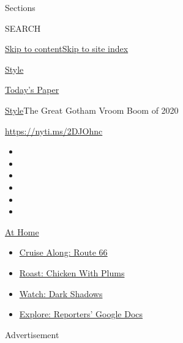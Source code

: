 Sections

SEARCH

\protect\hyperlink{site-content}{Skip to
content}\protect\hyperlink{site-index}{Skip to site index}

\href{https://www.nytimes3xbfgragh.onion/section/style}{Style}

\href{https://myaccount.nytimes3xbfgragh.onion/auth/login?response_type=cookie\&client_id=vi}{}

\href{https://www.nytimes3xbfgragh.onion/section/todayspaper}{Today's
Paper}

\href{/section/style}{Style}\textbar{}The Great Gotham Vroom Boom of
2020

\url{https://nyti.ms/2DJOhnc}

\begin{itemize}
\item
\item
\item
\item
\item
\item
\end{itemize}

\href{https://www.nytimes3xbfgragh.onion/spotlight/at-home?action=click\&pgtype=Article\&state=default\&region=TOP_BANNER\&context=at_home_menu}{At
Home}

\begin{itemize}
\tightlist
\item
  \href{https://www.nytimes3xbfgragh.onion/2020/09/07/travel/route-66.html?action=click\&pgtype=Article\&state=default\&region=TOP_BANNER\&context=at_home_menu}{Cruise
  Along: Route 66}
\item
  \href{https://www.nytimes3xbfgragh.onion/2020/09/04/dining/sheet-pan-chicken.html?action=click\&pgtype=Article\&state=default\&region=TOP_BANNER\&context=at_home_menu}{Roast:
  Chicken With Plums}
\item
  \href{https://www.nytimes3xbfgragh.onion/2020/09/04/arts/television/dark-shadows-stream.html?action=click\&pgtype=Article\&state=default\&region=TOP_BANNER\&context=at_home_menu}{Watch:
  Dark Shadows}
\item
  \href{https://www.nytimes3xbfgragh.onion/interactive/2020/at-home/even-more-reporters-editors-diaries-lists-recommendations.html?action=click\&pgtype=Article\&state=default\&region=TOP_BANNER\&context=at_home_menu}{Explore:
  Reporters' Google Docs}
\end{itemize}

Advertisement

